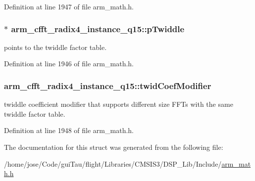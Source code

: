 Definition at line 1947 of file arm\-\_\-math.\-h.

\hypertarget{structarm__cfft__radix4__instance__q15_a29dd693537e45421a36891f8439e1fba}{
\subsubsection[{p\-Twiddle}]{$\ast$ arm\-\_\-cfft\-\_\-radix4\-\_\-instance\-\_\-q15\-::p\-Twiddle}}\label{structarm__cfft__radix4__instance__q15_a29dd693537e45421a36891f8439e1fba}
points to the twiddle factor table. 

Definition at line 1946 of file arm\-\_\-math.\-h.

\hypertarget{structarm__cfft__radix4__instance__q15_af32fdc78bcc27ca385f9b76a0a1f71c3}{
\subsubsection[{twid\-Coef\-Modifier}]{ arm\-\_\-cfft\-\_\-radix4\-\_\-instance\-\_\-q15\-::twid\-Coef\-Modifier}}\label{structarm__cfft__radix4__instance__q15_af32fdc78bcc27ca385f9b76a0a1f71c3}
twiddle coefficient modifier that supports different size F\-F\-Ts with the same twiddle factor table. 

Definition at line 1948 of file arm\-\_\-math.\-h.



The documentation for this struct was generated from the following file\-:\begin{DoxyCompactItemize}
\item 
/home/jose/\-Code/gui\-Tau/flight/\-Libraries/\-C\-M\-S\-I\-S3/\-D\-S\-P\-\_\-\-Lib/\-Include/\hyperlink{arm__math_8h}{arm\-\_\-math.\-h}\end{DoxyCompactItemize}
